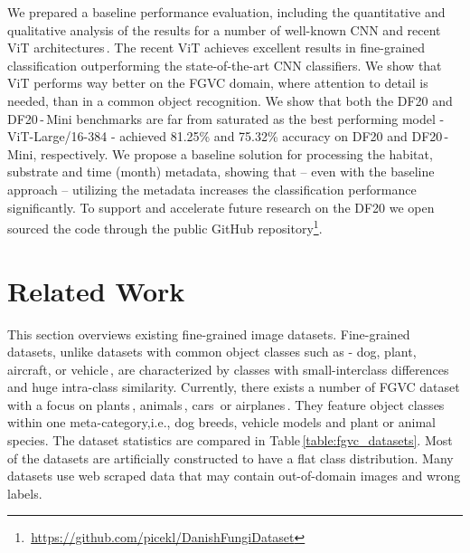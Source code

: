 \documentclass[10pt,twocolumn,letterpaper]{article}
\begin{document}
We prepared a baseline performance evaluation, including the quantitative and qualitative analysis of the results for a number of well-known CNN and recent ViT architectures\,\cite{vit}. The recent ViT achieves excellent results in fine-grained classification outperforming the state-of-the-art CNN classifiers. We show that ViT performs way better on the FGVC domain, where attention to detail is needed, than in a common object recognition. 
We show that both the DF20 and DF20\,-\,Mini benchmarks are far from saturated as the best performing model - ViT-Large/16-384 - achieved 81.25\% and 75.32\% accuracy on DF20 and DF20\,-\,Mini, respectively.  
We propose a baseline solution for processing the habitat, substrate and time (month) metadata, showing that -- even with the baseline approach -- utilizing the metadata increases the classification performance significantly. To support and accelerate future research on the DF20 we open sourced the code through the public GitHub repository\footnote{\,\url{https://github.com/picekl/DanishFungiDataset}}.

\section{Related Work}

This section overviews existing fine-grained image datasets. Fine-grained datasets, unlike datasets with common object classes such as - dog, plant, aircraft, or vehicle\,\cite{imagenet, voc, cifar}, are characterized by classes with small-interclass differences and huge intra-class similarity. Currently, there exists a number of FGVC dataset with a focus on plants\,\cite{plantclef2017, vegfru_dataset, plantclef2015, leafsnap, dataset-flower}, animals\,\cite{dataset-dataset-DOGS, nabirds_dataset, dataset-CUBS}, cars\,\cite{dataset-Cars,vmmrdb} or airplanes\,\cite{aircafts}. They feature object classes within one meta-category,i.e., dog breeds, vehicle models and plant or animal species. The dataset statistics are compared in Table\,\ref{table:fgvc_datasets}. Most of the datasets are artificially constructed to have a flat class distribution. Many datasets use web scraped data that may contain out-of-domain images and wrong labels.
\end{document}
